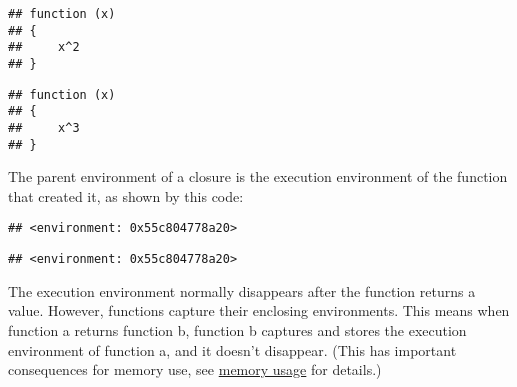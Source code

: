 \begin{Shaded}
\begin{Highlighting}[]
\end{Highlighting}
\end{Shaded}

\begin{verbatim}
## function (x) 
## {
##     x^2
## }
\end{verbatim}

\begin{Shaded}
\begin{Highlighting}[]
\end{Highlighting}
\end{Shaded}

\begin{verbatim}
## function (x) 
## {
##     x^3
## }
\end{verbatim}

The parent environment of a closure is the execution environment of the
function that created it, as shown by this code:

\begin{Shaded}
\begin{Highlighting}[]
\StringTok{ }
  \NormalTok{(}\NormalTok{())}
  \OperatorTok{^}\StringTok{ }
\NormalTok{\}}
\StringTok{ }\NormalTok{(}\NormalTok{)}
\end{Highlighting}
\end{Shaded}

\begin{verbatim}
## <environment: 0x55c804778a20>
\end{verbatim}

\begin{Shaded}
\begin{Highlighting}[]
\end{Highlighting}
\end{Shaded}

\begin{verbatim}
## <environment: 0x55c804778a20>
\end{verbatim}

The execution environment normally disappears after the function returns
a value. However, functions capture their enclosing environments. This
means when function a returns function b, function b captures and stores
the execution environment of function a, and it doesn't disappear. (This
has important consequences for memory use, see
\protect\hyperlink{gc}{memory usage} for details.)

